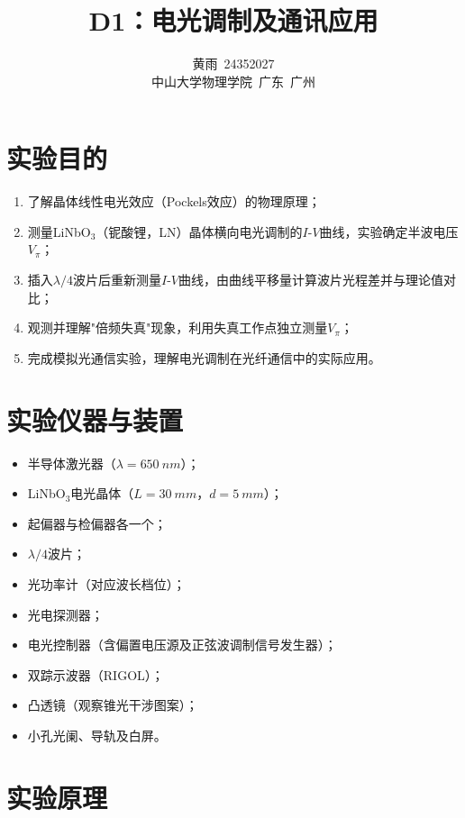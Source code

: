 \documentclass[a4paper,8pt,twocolumn]{article}
\title{
  \textbf{\huge D1：电光调制及通讯应用}
}
\author{
  黄雨~24352027\\
  \small 中山大学物理学院~广东~广州
}
\begin{document}
\maketitle
\newpage

\section{实验目的}

\begin{enumerate}
  \item 了解晶体线性电光效应（Pockels效应）的物理原理；
  \item 测量LiNbO$_3$（铌酸锂，LN）晶体横向电光调制的$I$-$V$曲线，实验确定半波电压$V_\pi$；
  \item 插入$\lambda/4$波片后重新测量$I$-$V$曲线，由曲线平移量计算波片光程差并与理论值对比；
  \item 观测并理解"倍频失真"现象，利用失真工作点独立测量$V_\pi$；
  \item 完成模拟光通信实验，理解电光调制在光纤通信中的实际应用。
\end{enumerate}

\section{实验仪器与装置}

\begin{itemize}
  \item 半导体激光器（$\lambda=\SI{650}{nm}$）；
  \item LiNbO$_3$电光晶体（$L=\SI{30}{mm}$，$d=\SI{5}{mm}$）；
  \item 起偏器与检偏器各一个；
  \item $\lambda/4$波片；
  \item 光功率计（对应波长档位）；
  \item 光电探测器；
  \item 电光控制器（含偏置电压源及正弦波调制信号发生器）；
  \item 双踪示波器（RIGOL）；
  \item 凸透镜（观察锥光干涉图案）；
  \item 小孔光阑、导轨及白屏。
\end{itemize}

\section{实验原理}
\end{document}
